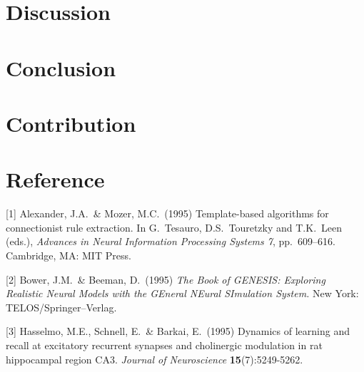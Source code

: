 \documentclass{article}
\begin{document}
\section{Discussion}

\section{Conclusion}


\section{Contribution}

\section{Reference}


\small

[1] Alexander, J.A.\ \& Mozer, M.C.\ (1995) Template-based algorithms for
connectionist rule extraction. In G.\ Tesauro, D.S.\ Touretzky and T.K.\ Leen
(eds.), {\it Advances in Neural Information Processing Systems 7},
pp.\ 609--616. Cambridge, MA: MIT Press.

[2] Bower, J.M.\ \& Beeman, D.\ (1995) {\it The Book of GENESIS: Exploring
  Realistic Neural Models with the GEneral NEural SImulation System.}  New York:
TELOS/Springer--Verlag.

[3] Hasselmo, M.E., Schnell, E.\ \& Barkai, E.\ (1995) Dynamics of learning and
recall at excitatory recurrent synapses and cholinergic modulation in rat
hippocampal region CA3. {\it Journal of Neuroscience} {\bf 15}(7):5249-5262.
\end{document}
